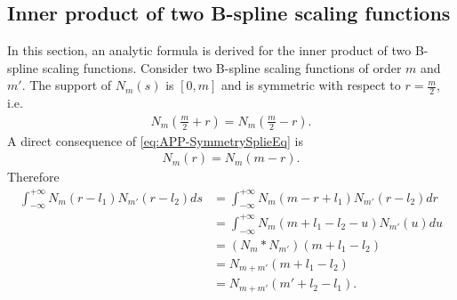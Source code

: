 \documentclass[11pt,draftcls,onecolumn,peerreview]{IEEEtran}
\begin{document}
\subsection{Inner product of two B-spline scaling functions}\label{ap:InnerProductOfBsplines}
In this section, an analytic formula is derived for the inner product of two B-spline scaling functions. Consider two B-spline scaling functions of order $m$ and $m'$. The support of $N_m\left(s\right)$ is $\left[ 0,m\right]$ and  is symmetric with respect to $r=\frac{m}{2}$, i.e.
\begin{align}\label{eq:APP-SymmetrySplieEq}
 N_{m}\left(\frac{m}{2}+r\right)=N_{m}\left(\frac{m}{2}-r\right).
\end{align}
A direct consequence of \eqref{eq:APP-SymmetrySplieEq} is 
\begin{align}
 N_{m}\left(r\right)=N_{m}\left(m-r\right).
\end{align}
Therefore
\begin{align}
\int_{-\infty}^{+\infty}N_{m}\left(r-l_{1}\right)N_{m'}\left(r-l_{2}\right)ds&=\int_{-\infty}^{+\infty}N_{m}\left(m-r+l_{1}\right)N_{m'}\left(r-l_{2}\right)dr \nonumber \\
&=\int_{-\infty}^{+\infty}N_{m}\left(m+l_{1}-l_{2}-u\right)N_{m'}\left(u\right)du \nonumber \\
&=\left(N_m \ast N_{m'}\right) \left(m+l_{1}-l_{2}\right) \nonumber \\
&=N_{m+m'}\left(m+l_{1}-l_{2}\right) \nonumber \\
&=N_{m+m'}\left(m'+l_{2}-l_{1}\right).
\end{align}
\end{document}
